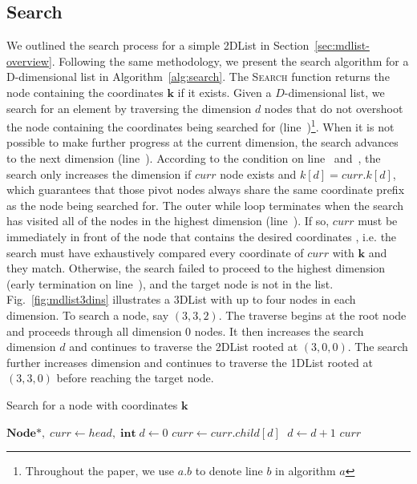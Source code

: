 \documentclass[10pt,journal,letter,compsoc]{IEEEtran}
\newcommand\NIL{\text{NIL}}
\newcommand\AND{\;\text{\textbf{and}}\;}
\newcommand\OR{\;\text{\textbf{or}}\;}
\begin{document}
\subsection{Search}
\label{sec:search}
We outlined the search process for a simple 2DList in Section~\ref{sec:mdlist-overview}.
Following the same methodology, we present the search algorithm for a D-dimensional list in Algorithm~\ref{alg:search}.
The \textsc{Search} function returns the node containing the coordinates $\mathbf{k}$ if it exists.  
Given a $D$-dimensional list, we search for an element by traversing the dimension $d$ nodes that do not overshoot the node containing the coordinates being searched for (line~)\footnote{Throughout the paper, we use $a.b$ to denote line $b$ in algorithm $a$}.
When it is not possible to make further progress at the current dimension, the search advances to the next dimension (line~).
According to the condition on line~ and~, the search only increases the dimension if $curr$ node exists and $k[d]=curr.k[d]$, which guarantees that those pivot nodes always share the same coordinate prefix as the node being searched for.
The outer while loop terminates when the search has visited all of the nodes in the highest dimension (line~).
If so, $curr$ must be immediately in front of the node that contains the desired coordinates , i.e. the search must have exhaustively compared every coordinate of $curr$ with $\mathbf{k}$ and they match.
Otherwise, the search failed to proceed to the highest dimension (early termination on line~), and the target node is not in the list.
Fig.~\ref{fig:mdlist3dins} illustrates a 3DList with up to four nodes in each dimension.
To search a node, say $(3,3,2)$.
The traverse begins at the root node and proceeds through all dimension 0 nodes.
It then increases the search dimension $d$ and continues to traverse the 2DList rooted at $(3,0,0)$.
The search further increases dimension and continues to traverse the 1DList rooted at $(3,3,0)$ before reaching the target node.

\begin{algorithm}[t]
    \caption{Search for a node with coordinates $\mathbf{k}$}
    \label{alg:search}
    \begin{algorithmic}[1]
        \State $\textbf{Node*},\;curr \gets head,\;\textbf{int}\;d \gets 0$
         \label{l:searchend}
        \While {$curr\neq\NIL \AND k[d] > curr.k[d]$} \label{l:overshoot}
        \State $curr \gets curr.child[d]$
        \EndWhile
        \If {$curr=\NIL \OR k[d] < curr.k[d]$} \Return \NIL \label{l:checknexdim}
        \Else $\;d \gets d+1$ \label{l:advance}
        \EndIf
        \EndWhile
        \State \Return $curr$
        \EndFunction
    \end{algorithmic}
\end{algorithm}
\end{document}
